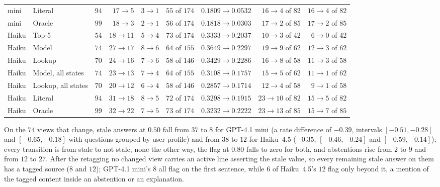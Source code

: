 \begin{table}[H]
\begin{tabular}{@{}llrrrrrrr@{}}
mini & Literal & $94$ & $17 \to 5$ & $3 \to 1$ & $55$ of $174$ & $0.1809 \to 0.0532$ & $16 \to 4$ of $82$ & $16 \to 4$ of $82$ \\
mini & Oracle & $99$ & $18 \to 3$ & $2 \to 1$ & $56$ of $174$ & $0.1818 \to 0.0303$ & $17 \to 2$ of $85$ & $17 \to 2$ of $85$ \\ \midrule
Haiku & Top-5 & $54$ & $18 \to 11$ & $5 \to 4$ & $73$ of $174$ & $0.3333 \to 0.2037$ & $10 \to 3$ of $42$ & $6 \to 0$ of $42$ \\
Haiku & Model & $74$ & $27 \to 17$ & $8 \to 6$ & $64$ of $155$ & $0.3649 \to 0.2297$ & $19 \to 9$ of $62$ & $12 \to 3$ of $62$ \\
Haiku & Lookup & $70$ & $24 \to 16$ & $7 \to 6$ & $58$ of $146$ & $0.3429 \to 0.2286$ & $16 \to 8$ of $58$ & $11 \to 3$ of $58$ \\
Haiku & Model, all states & $74$ & $23 \to 13$ & $7 \to 4$ & $64$ of $155$ & $0.3108 \to 0.1757$ & $15 \to 5$ of $62$ & $11 \to 1$ of $62$ \\
Haiku & Lookup, all states & $70$ & $20 \to 12$ & $6 \to 4$ & $58$ of $146$ & $0.2857 \to 0.1714$ & $12 \to 4$ of $58$ & $9 \to 1$ of $58$ \\
Haiku & Literal & $94$ & $31 \to 18$ & $8 \to 5$ & $72$ of $174$ & $0.3298 \to 0.1915$ & $23 \to 10$ of $82$ & $15 \to 5$ of $82$ \\
Haiku & Oracle & $99$ & $32 \to 22$ & $7 \to 5$ & $73$ of $174$ & $0.3232 \to 0.2222$ & $23 \to 13$ of $85$ & $15 \to 7$ of $85$ \\
\bottomrule\end{tabular}
\end{table}

On the $74$ views that change, stale answers at $0.50$ fall from $37$ to $8$ for GPT-4.1 mini (a rate difference of $-0.39$, intervals $[-0.51,-0.28]$ and $[-0.65,-0.18]$ with questions grouped by user profile) and from $38$ to $12$ for Haiku~4.5 ($-0.35$, $[-0.46,-0.24]$ and $[-0.59,-0.14]$); every transition is from stale to not stale, none the other way, the flag at $0.80$ falls to zero for both, and abstentions rise from $2$ to $9$ and from $12$ to $27$. After the retagging no changed view carries an active line asserting the stale value, so every remaining stale answer on them has a tagged source ($8$ and $12$); GPT-4.1 mini's $8$ all flag on the first sentence, while $6$ of Haiku~4.5's $12$ flag only beyond it, a mention of the tagged content inside an abstention or an explanation.
